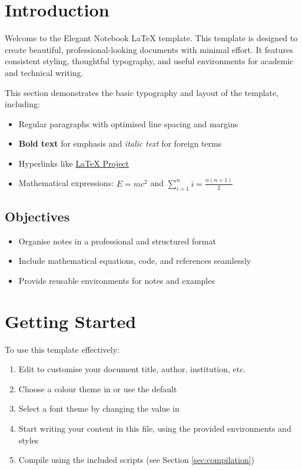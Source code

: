 \documentclass[a4paper,11pt]{article}
\begin{document}


\tableofcontents
\newpage

\section{Introduction}
Welcome to the Elegant Notebook LaTeX template. This template is designed to create beautiful, professional-looking documents with minimal effort. It features consistent styling, thoughtful typography, and useful environments for academic and technical writing.

This section demonstrates the basic typography and layout of the template, including:

\begin{itemize}
    \item Regular paragraphs with optimised line spacing and margins
    \item \textbf{Bold text} for emphasis and \textit{italic text} for foreign terms
    \item Hyperlinks like \href{https://www.latex-project.org/}{LaTeX Project}
    \item Mathematical expressions: $E = mc^2$ and $\sum_{i=1}^{n} i = \frac{n(n+1)}{2}$
\end{itemize}

\subsection{Objectives}
\begin{itemize}
    \item Organise notes in a professional and structured format
    \item Include mathematical equations, code, and references seamlessly
    \item Provide reusable environments for notes and examples
\end{itemize}

\section{Getting Started}
To use this template effectively:

\begin{enumerate}
    \item Edit  to customise your document title, author, institution, etc.
    \item Choose a colour theme in  or use the default
    \item Select a font theme by changing the \inlinecode{\\fonttheme} value in 
    \item Start writing your content in this file, using the provided environments and styles
    \item Compile using the included scripts (see Section \ref{sec:compilation})
\end{enumerate}
\end{document}
